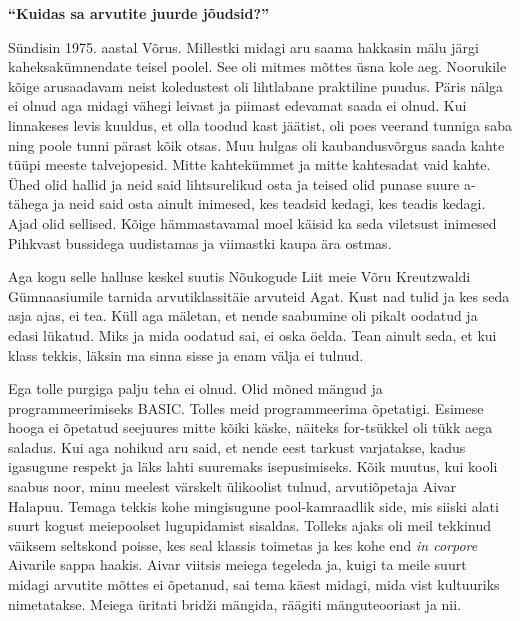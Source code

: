 
\textbf{\enquote{Kuidas sa arvutite juurde jõudsid?}}

Sündisin 1975. aastal Võrus. Millestki midagi aru saama hakkasin 
mälu järgi kaheksakümnendate teisel poolel. See oli mitmes mõttes üsna kole 
aeg. Noorukile kõige arusaadavam neist koledustest oli lihtlabane praktiline 
puudus. Päris nälga ei olnud aga midagi vähegi leivast ja piimast edevamat 
saada ei olnud. Kui linnakeses levis kuuldus, et olla toodud kast jäätist, oli 
poes veerand tunniga saba ning poole tunni pärast kõik otsas. Muu hulgas oli 
kaubandusvõrgus saada kahte tüüpi meeste talvejopesid. Mitte kahtekümmet ja 
mitte kahtesadat vaid kahte. Ühed olid hallid ja neid said lihtsurelikud 
osta ja teised olid punase suure a-tähega ja neid said osta 
ainult inimesed, kes teadsid kedagi, kes teadis kedagi. Ajad olid sellised. 
Kõige hämmastavamal moel käisid ka seda viletsust inimesed Pihkvast bussidega 
uudistamas ja viimastki kaupa ära ostmas. 

Aga kogu selle halluse keskel suutis Nõukogude Liit meie Võru Kreutzwaldi 
Gümnaasiumile tarnida 
arvutiklassitäie arvuteid Agat. Kust nad tulid ja kes 
seda asja ajas, ei tea. Küll aga mäletan, et nende saabumine oli pikalt oodatud 
ja edasi lükatud. Miks ja mida oodatud sai, ei oska öelda. Tean ainult seda, et 
kui klass tekkis, läksin ma sinna sisse ja enam välja ei tulnud. 

Ega tolle purgiga palju teha ei olnud. Olid mõned mängud ja programmeerimiseks 
BASIC. Tolles meid programmeerima õpetatigi. Esimese hooga ei õpetatud 
seejuures mitte kõiki käske, näiteks for-tsükkel oli tükk aega saladus. Kui aga 
nohikud aru said, et nende eest tarkust varjatakse, kadus igasugune respekt ja 
läks lahti suuremaks isepusimiseks. Kõik muutus, kui kooli saabus noor, minu 
meelest värskelt ülikoolist tulnud, arvutiõpetaja Aivar 
Halapuu. Temaga tekkis kohe mingisugune 
pool-kamraadlik side, mis siiski alati suurt kogust meiepoolset lugupidamist 
sisaldas. Tolleks ajaks oli meil tekkinud väiksem seltskond poisse, kes seal 
klassis toimetas ja kes kohe end \emph{in corpore} Aivarile sappa haakis. Aivar 
viitsis meiega tegeleda ja, kuigi ta meile suurt midagi arvutite mõttes ei 
õpetanud, sai tema käest midagi, mida vist kultuuriks nimetatakse. Meiega 
üritati bridži mängida, räägiti mänguteooriast ja nii. 

